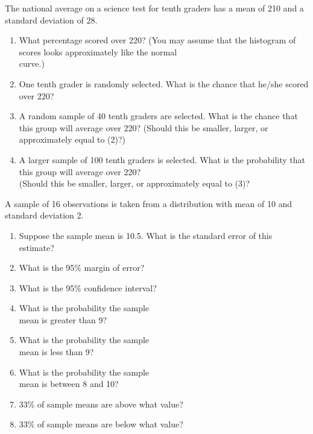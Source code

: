 \documentclass[11pt, chapterprefix=true]{scrbook}\usepackage[]{graphicx}\usepackage[]{color}
\begin{document}
\begin{exercises}

\begin{exercise}  %

The national average on a science test for tenth graders has a mean of 210 and a standard deviation of 28.

\begin{enumerate}
  \item What percentage scored over 220?  (You may assume that the histogram of scores looks approximately like the normal \\ curve.)
  \item One tenth grader is randomly selected.  What is the chance that he/she scored over 220?
  \item A random sample of 40 tenth graders are selected.  What is the chance that this group will average over 220? (Should this be smaller, larger, or approximately equal to (2)?)
  \item A larger sample of 100 tenth graders is selected.  What is the probability that this group will average over 220?  \\ (Should this be smaller, larger, or approximately equal to (3)?
\end{enumerate}

\end{exercise}
\begin{solution}  %

\end{solution}

\begin{exercise}  %

A sample of 16 observations is taken from a distribution with mean of 10 and standard deviation 2.

\begin{enumerate}
  \item Suppose the sample mean is 10.5. What is the standard error of this estimate?
  \item What is the 95\% margin of error?
  \item What is the 95\% confidence interval?
  \item What is the probability the sample \\ mean is greater than 9?
  \item What is the probability the sample \\ mean is less than 9? 
  \item What is the probability the sample \\ mean is between 8 and 10? 
  \item 33\% of sample means are above what value? 
  \item 33\% of sample means are below what value?
\end{enumerate}
\end{exercise}
\begin{solution}  %


\end{solution}
\end{exercises}
\end{document}
